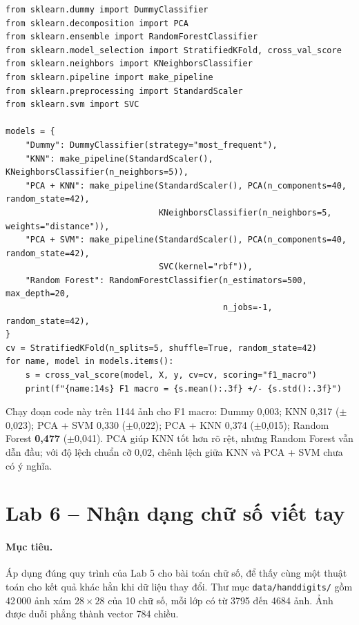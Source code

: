 \begin{lstlisting}[caption={Lab 5 -- phiên bản đã sửa: mô hình cơ sở, PCA và kiểm định chéo phân tầng}]
from sklearn.dummy import DummyClassifier
from sklearn.decomposition import PCA
from sklearn.ensemble import RandomForestClassifier
from sklearn.model_selection import StratifiedKFold, cross_val_score
from sklearn.neighbors import KNeighborsClassifier
from sklearn.pipeline import make_pipeline
from sklearn.preprocessing import StandardScaler
from sklearn.svm import SVC

models = {
    "Dummy": DummyClassifier(strategy="most_frequent"),
    "KNN": make_pipeline(StandardScaler(), KNeighborsClassifier(n_neighbors=5)),
    "PCA + KNN": make_pipeline(StandardScaler(), PCA(n_components=40, random_state=42),
                               KNeighborsClassifier(n_neighbors=5, weights="distance")),
    "PCA + SVM": make_pipeline(StandardScaler(), PCA(n_components=40, random_state=42),
                               SVC(kernel="rbf")),
    "Random Forest": RandomForestClassifier(n_estimators=500, max_depth=20,
                                            n_jobs=-1, random_state=42),
}
cv = StratifiedKFold(n_splits=5, shuffle=True, random_state=42)
for name, model in models.items():
    s = cross_val_score(model, X, y, cv=cv, scoring="f1_macro")
    print(f"{name:14s} F1 macro = {s.mean():.3f} +/- {s.std():.3f}")
\end{lstlisting}

\noindent Chạy đoạn code này trên 1144 ảnh cho F1 macro: Dummy 0,003; KNN 0,317 ($\pm$0,023); PCA + SVM 0,330 ($\pm$0,022); PCA + KNN 0,374 ($\pm$0,015); Random Forest \textbf{0,477} ($\pm$0,041). PCA giúp KNN tốt hơn rõ rệt, nhưng Random Forest vẫn dẫn đầu; với độ lệch chuẩn cỡ 0,02, chênh lệch giữa KNN và PCA + SVM chưa có ý nghĩa.

\section{Lab 6 -- Nhận dạng chữ số viết tay}
\label{sec:lab-digits}

\paragraph{Mục tiêu.} Áp dụng đúng quy trình của Lab 5 cho bài toán chữ số, để thấy cùng một thuật toán cho kết quả khác hẳn khi dữ liệu thay đổi. Thư mục \texttt{data/handdigits/} gồm 42\,000 ảnh xám $28 \times 28$ của 10 chữ số, mỗi lớp có từ 3795 đến 4684 ảnh. Ảnh được duỗi phẳng thành vector 784 chiều.

